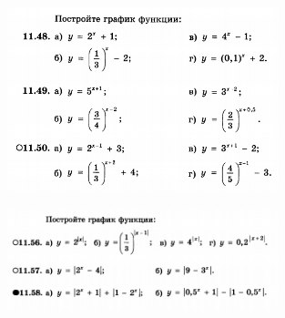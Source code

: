 
\begin{figure}[h!]
	\centering
	\includegraphics[width=0.7\textwidth]{img/pokaz_t1.png}
\end{figure}

\begin{figure}[h!]
	\centering
	\includegraphics[width=0.7\textwidth]{img/pokaz_t2.png}
\end{figure}